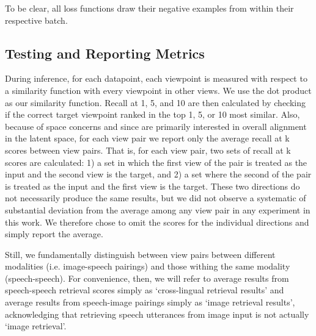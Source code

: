 To be clear, all loss functions draw their negative examples from within their respective batch.


\subsection{Testing and Reporting Metrics}
\label{section:obj_exp_testing_rep}
During inference, for each datapoint, each viewpoint is measured with respect to a similarity function with every viewpoint in other views. 
We use the dot product as our similarity function.
Recall at 1, 5, and 10 are then calculated by checking if the correct target viewpoint ranked in the top 1, 5, or 10 most similar.
Also, because of space concerns and since are primarily interested in overall alignment in the latent space, for each view pair we report only the average recall at k scores between view pairs.
That is, for each view pair, two sets of recall at k scores are calculated: 1) a set in which the first view of the pair is treated as the input and the second view is the target, and 2) a set where the second of the pair is treated as the input and the first view is the target.
These two directions do not necessarily produce the same results, but we did not observe a systematic of substantial deviation from the average among any view pair in any experiment in this work.
We therefore chose to omit the scores for the individual directions and simply report the average.

Still, we fundamentally distinguish between view pairs between different modalities (i.e. image-speech pairings) and those withing the same modality (speech-speech).
For convenience, then, we will refer to average results from speech-speech retrieval scores simply as `cross-lingual retrieval results' and average results from speech-image pairings simply as `image retrieval results', acknowledging that retrieving speech utterances from image input is not actually `image retrieval'.
